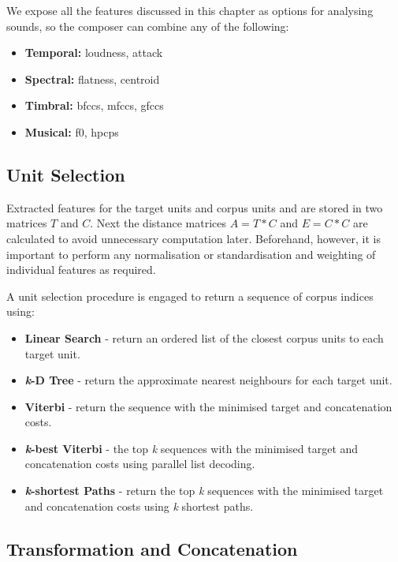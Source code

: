 {{{{{{{{We expose all the features discussed in this chapter as options for analysing sounds, so the composer can combine any of the following:

\begin{itemize}
\item \textbf{Temporal:} loudness, attack
\item \textbf{Spectral:} flatness, centroid
\item \textbf{Timbral:} \acrshort{bfcc}s, \acrshort{mfcc}s, \acrshort{gfcc}s
\item \textbf{Musical:} f0, \acrshort{hpcp}s
\end{itemize}

\subsection{Unit Selection}

Extracted features for the target units and corpus units and are stored in two matrices $T$ and $C$. Next the distance matrices $A = T * C$  and $E = C * C$ are calculated to avoid unnecessary computation later. Beforehand, however, it is important to perform any normalisation or standardisation and weighting of individual features as required.

A unit selection procedure is engaged to return a sequence of corpus indices using:

\begin{itemize}
\item \textbf{Linear Search} - return an ordered list of the closest corpus units to each target unit.
\item \textbf{\textit{k}-D Tree} - return the approximate nearest neighbours for each target unit.
\item \textbf{Viterbi }- return the sequence with the minimised target and concatenation costs.
\item \textbf{\textit{k}-best Viterbi} - the top \textit{k} sequences with the minimised target and concatenation costs using parallel list decoding.
\item \textbf{\textit{k}-shortest Paths} - return the top \textit{k} sequences with the minimised target and concatenation costs using \textit{k} shortest paths.
\end{itemize}

\subsection{Transformation and Concatenation}
\label{sec:rubberband}

}}}}}}}}
